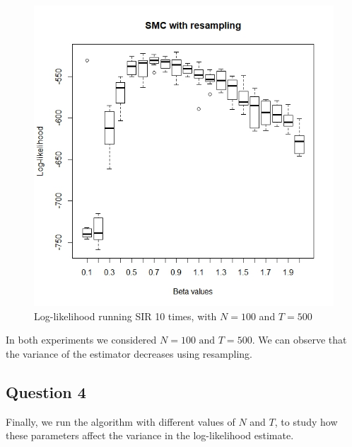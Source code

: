 \documentclass[]{article}
\begin{document}
\begin{figure}
	\includegraphics[width=\columnwidth]{task1/SIR_N_100_T_500.jpeg}
	\caption{Log-likelihood running SIR 10 times, with $N=100$ and $T=500$}
\end{figure}

In both experiments we considered $N=100 \text{ and } T=500$. We can observe that the variance of the estimator decreases using resampling. 

\subsection*{Question 4}
Finally, we run the algorithm with different values of $N$ and $T$, to study how these parameters affect the variance in the log-likelihood estimate. 
\end{document}
